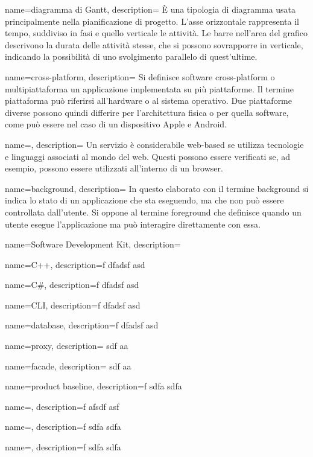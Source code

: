 {
  name=diagramma di Gantt,
  description={ È una tipologia di diagramma usata principalmente nella pianificazione di progetto. L'asse orizzontale rappresenta il tempo, suddiviso in fasi e quello
  verticale le attività. Le barre nell'area del grafico descrivono la durata delle attività stesse, che si possono sovrapporre in verticale,
  indicando la possibilità di uno svolgimento parallelo di quest'ultime.}
}

{
  name=cross-platform,
  description={ Si definisce software cross-platform o multipiattaforma un applicazione implementata su più piattaforme. Il termine
  piattaforma può riferirsi all'hardware o al sistema operativo. Due piattaforme diverse possono quindi differire per l'architettura fisica
  o per quella software, come può essere nel caso di un dispositivo \gls{Apple} e \gls{Android}. }
}

{
  name=,
  description={ Un servizio è considerabile web-based se utilizza tecnologie e linguaggi associati al mondo del web. Questi possono essere
  verificati se, ad esempio, possono essere utilizzati all'interno di un browser.}
}

{
  name=background,
  description={ In questo elaborato con il termine background si indica lo stato di un applicazione che sta eseguendo, ma che non
  può essere controllata dall'utente. Si oppone al termine foreground che definisce quando un utente esegue l'applicazione ma può
  interagire direttamente con essa.  }
}

{
  name=Software Development Kit,
  description={  }
}


{
  name=C++,
  description={f dfadsf asd }
}

{
  name=C\#,
  description={f dfadsf asd }
}

{
  name=CLI,
  description={f dfadsf asd }
}

{
  name=database,
  description={f dfadsf asd }
}

{
  name={proxy},
  description={ sdf aa }
}

{
  name={facade},
  description={ sdf aa }
}

{
  name={product baseline},
  description={f  sdfa sdfa}
}

{
  name=,
  description={f afsdf asf }
}

{
  name=,
  description={f  sdfa sdfa}
}


{
  name=,
  description={f  sdfa sdfa}
}
